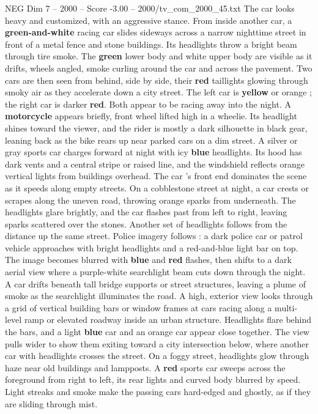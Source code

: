 \begin{textsample}{NEG Dim 7 – 2000 – Score -3.00 – 2000/tv\_com\_2000\_45.txt}
The car looks heavy and customized, with an aggressive stance.
From inside another car, a \textbf{green-and-white} racing car slides sideways across a narrow nighttime street in front of a metal fence and stone buildings.
Its headlights throw a bright beam through tire smoke.
The \textbf{green} lower body and white upper body are visible as it drifts, wheels angled, smoke curling around the car and across the pavement.
Two cars are then seen from behind, side by side, their \textbf{red} taillights glowing through smoky air as they accelerate down a city street.
The left car is \textbf{yellow} or orange ; the right car is darker \textbf{red}.
Both appear to be racing away into the night.
A \textbf{motorcycle} appears briefly, front wheel lifted high in a wheelie.
Its headlight shines toward the viewer, and the rider is mostly a dark silhouette in black gear, leaning back as the bike rears up near parked cars on a dim street.
A silver or gray sports car charges forward at night with icy \textbf{blue} headlights.
Its hood has dark vents and a central stripe or raised line, and the windshield reflects orange vertical lights from buildings overhead.
The car ’s front end dominates the scene as it speeds along empty streets.
On a cobblestone street at night, a car crests or scrapes along the uneven road, throwing orange sparks from underneath.
The headlights glare brightly, and the car flashes past from left to right, leaving sparks scattered over the stones.
Another set of headlights follows from the distance up the same street.
Police imagery follows : a dark police car or patrol vehicle approaches with bright headlights and a red-and-blue light bar on top.
The image becomes blurred with \textbf{blue} and \textbf{red} flashes, then shifts to a dark aerial view where a purple-white searchlight beam cuts down through the night.
A car drifts beneath tall bridge supports or street structures, leaving a plume of smoke as the searchlight illuminates the road.
A high, exterior view looks through a grid of vertical building bars or window frames at cars racing along a multi-level ramp or elevated roadway inside an urban structure.
Headlights flare behind the bars, and a light \textbf{blue} car and an orange car appear close together.
The view pulls wider to show them exiting toward a city intersection below, where another car with headlights crosses the street.
On a foggy street, headlights glow through haze near old buildings and lampposts.
A \textbf{red} sports car sweeps across the foreground from right to left, its rear lights and curved body blurred by speed.
Light streaks and smoke make the passing cars hard-edged and ghostly, as if they are sliding through mist.

\end{textsample}
